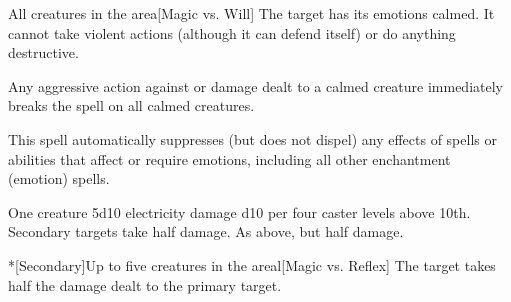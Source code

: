 \begin{spellheader}
\end{spellheader}
\begin{spelleffects}
    \begin{spelltargets}{All creatures in the area}[Magic vs. Will]
        \spellsuccess The target has its emotions calmed. It cannot take violent actions (although it can defend itself) or do anything destructive.
    \end{spelltargets}
\end{spelleffects}
\begin{spellfooter}
    \spellnotes Any aggressive action against or damage dealt to a calmed creature immediately breaks the spell on all calmed creatures.

    This spell automatically suppresses (but does not dispel) any effects of spells or abilities that affect or require emotions, including all other enchantment (emotion) spells.
\end{spellfooter}

\begin{spellheader}
    \spellrng{\rngmed}
\end{spellheader}
\begin{spelleffects}
    \begin{spelltarget}[Primary]{One creature}
        \spellsuccess 5d10 electricity damage \add d10 per four caster levels above 10th. Secondary targets take half damage.
        \spellfailure As above, but half damage.
    \end{spelltarget}
    \begin{spelltargets}*[Secondary]{Up to five creatures in the area}l[Magic vs. Reflex]
        \spellsuccess The target takes half the damage dealt to the primary target.
    \end{spelltargets}
\end{spelleffects}

